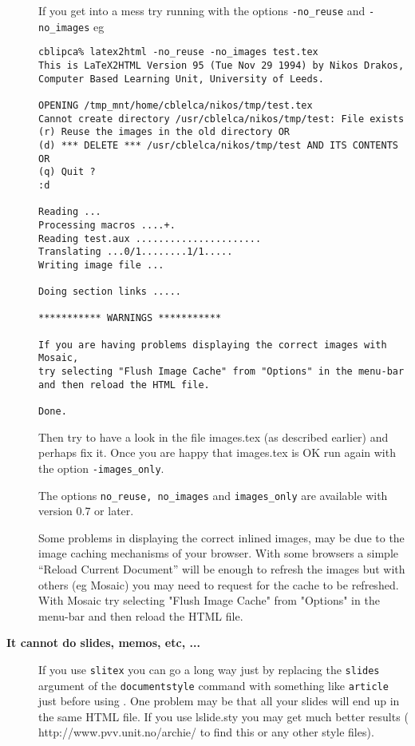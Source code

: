 \begin{description}
If you get into a mess try running \latextohtml with the options
{\tt -no\_reuse} and {\tt -no\_images} eg
\begin{verbatim}
cblipca% latex2html -no_reuse -no_images test.tex
This is LaTeX2HTML Version 95 (Tue Nov 29 1994) by Nikos Drakos, 
Computer Based Learning Unit, University of Leeds.

OPENING /tmp_mnt/home/cblelca/nikos/tmp/test.tex 
Cannot create directory /usr/cblelca/nikos/tmp/test: File exists
(r) Reuse the images in the old directory OR
(d) *** DELETE *** /usr/cblelca/nikos/tmp/test AND ITS CONTENTS OR
(q) Quit ?
:d

Reading ...
Processing macros ....+.
Reading test.aux ......................
Translating ...0/1........1/1.....
Writing image file ...

Doing section links .....

*********** WARNINGS ***********

If you are having problems displaying the correct images with Mosaic,
try selecting "Flush Image Cache" from "Options" in the menu-bar 
and then reload the HTML file.

Done.
\end{verbatim}

Then try to have a look 
in the file  {\fn images.tex} (as described earlier) and perhaps fix it.
Once you are happy that {\fn images.tex} is OK run \latextohtml
again with the option {\tt -images\_only}.

The options {\tt no\_reuse, no\_images} and {\tt images\_only}
are available with \latextohtml
version 0.7 or later.

Some problems in displaying the correct inlined images,
may be due to the image caching mechanisms of your browser.
With some browsers a simple ``Reload Current Document'' will be enough
to refresh the images but with others (eg Mosaic) you may need
to request for the cache to be refreshed. With Mosaic try 
selecting "Flush Image Cache" from "Options" in the menu-bar 
and then reload the HTML file.


\item [{\bf It cannot do slides, memos, etc, ...}] 
If you use {\tt slitex} you can go a long way just by replacing 
the {\tt slides} argument of the {\tt documentstyle} command with 
something like {\tt article} just before using \latextohtml.
One problem may be that all your slides will end up in the  same HTML 
file.
If you use {\fn lslide.sty} you may get much better results 
(
{http://www.pvv.unit.no/archie/} to find this or any other
style files).
\end{description}


